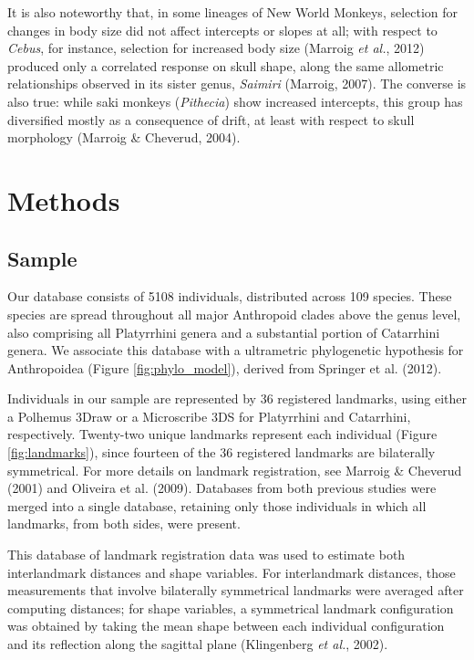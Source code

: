 \documentclass[12pt,]{article}
\begin{document}
It is also noteworthy that, in some lineages of New World Monkeys,
selection for changes in body size did not affect intercepts or slopes
at all; with respect to \emph{Cebus}, for instance, selection for
increased body size (Marroig \emph{et al.}, 2012) produced only a
correlated response on skull shape, along the same allometric
relationships observed in its sister genus, \emph{Saimiri} (Marroig,
2007). The converse is also true: while saki monkeys (\emph{Pithecia})
show increased intercepts, this group has diversified mostly as a
consequence of drift, at least with respect to skull morphology (Marroig
\& Cheverud, 2004).

\section{Methods}\label{methods}

\subsection{Sample}\label{sample}

Our database consists of 5108 individuals, distributed across 109
species. These species are spread throughout all major Anthropoid clades
above the genus level, also comprising all Platyrrhini genera and a
substantial portion of Catarrhini genera. We associate this database
with a ultrametric phylogenetic hypothesis for Anthropoidea (Figure
\ref{fig:phylo_model}), derived from Springer et al. (2012).

Individuals in our sample are represented by 36 registered landmarks,
using either a Polhemus 3Draw or a Microscribe 3DS for Platyrrhini and
Catarrhini, respectively. Twenty-two unique landmarks represent each
individual (Figure \ref{fig:landmarks}), since fourteen of the 36
registered landmarks are bilaterally symmetrical. For more details on
landmark registration, see Marroig \& Cheverud (2001) and Oliveira et
al. (2009). Databases from both previous studies were merged into a
single database, retaining only those individuals in which all
landmarks, from both sides, were present.

This database of landmark registration data was used to estimate both
interlandmark distances and shape variables. For interlandmark
distances, those measurements that involve bilaterally symmetrical
landmarks were averaged after computing distances; for shape variables,
a symmetrical landmark configuration was obtained by taking the mean
shape between each individual configuration and its reflection along the
sagittal plane (Klingenberg \emph{et al.}, 2002).
\end{document}
